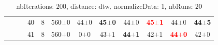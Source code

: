 \documentclass[12pt,a4paper,fleqn]{tufte-handout}
\begin{document}
\begin{table}
\begin{center}
\begin{tabular}{lllccccccccc}
 &  &  & 40 &  8 &   560$\pm$0 & 44$\pm$0 & \textbf{45$\pm$0} & 44$\pm$0 & \textbf{\textcolor{red}{45$\pm$1}} & 44$\pm$0 & \textbf{44$\pm$5} \\ 
 &  &  & 41 &  8 &   560$\pm$0 &  0$\pm$0 & 43$\pm$1 & \textbf{44$\pm$1} & 42$\pm$1 & \textbf{\textcolor{red}{44$\pm$0}} & 42$\pm$0 \\ 
\end{tabular} 
\end{center} 
\caption{nbIterations: 200, distance: dtw, normalizeData: 1, nbRuns: 20} 
\label{nbit200DidtNoda1Nbru20} 
\end{table} 
 
 
 
                
                
 
\end{document}
